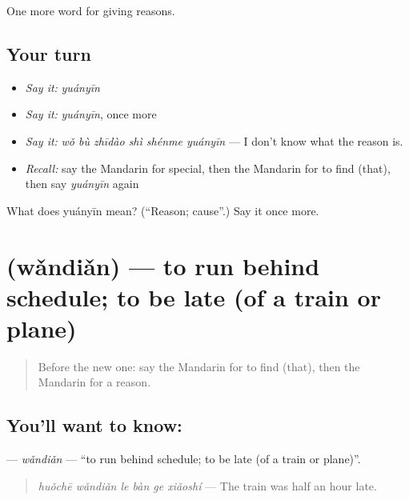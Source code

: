 \begin{grammarlens}[title={What you've built}]
One more word for giving reasons.
\end{grammarlens}

\subsection*{Your turn}
\begin{itemize}
\raggedright
  \item \emph{Say it:} \emph{yuányīn}
  \item \emph{Say it:} \emph{yuányīn}, once more
  \item \emph{Say it:} \emph{wǒ bù zhīdào shì shénme yuányīn} — I don't know what the reason is.
  \item \emph{Recall:} say the Mandarin for special, then the Mandarin for to find (that), then say \emph{yuányīn} again
\end{itemize}

\begin{tcolorbox}[breakable,colback=teal!4,colframe=teal!35!black,title={Before you move on}]
What does yuányīn mean? (\textquotedblleft{}Reason; cause\textquotedblright{}.) Say it once more.
\end{tcolorbox}
\section[\texorpdfstring{\zh{晚点} (wǎndiǎn)}{晚点 (wǎndiǎn)}]{ (wǎndiǎn) — to run behind schedule; to be late (of a train or plane)}

\label{lesson:ZH-C145-wandian}



\begin{quote}
Before the new one: say the Mandarin for to find (that), then the Mandarin for a reason.
\end{quote}

\subsection*{You'll want to know: }
\textbf{} — \emph{wǎndiǎn} — \textquotedblleft{}to run behind schedule; to be late (of a train or plane)\textquotedblright{}.

\begin{quote}
\textbf{} \emph{huǒchē wǎndiǎn le bàn ge xiǎoshí} — The train was half an hour late.
\end{quote}

